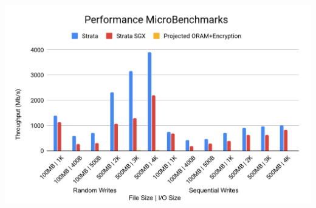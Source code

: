 \documentclass[letterpaper,twocolumn,10pt]{article}
\begin{document}
\begin{minipage}{\linewidth}
\centering
    \includegraphics[width=\textwidth]{performance.png}
      \label{fig:microbench}
\end{minipage}
\\

\end{document}
